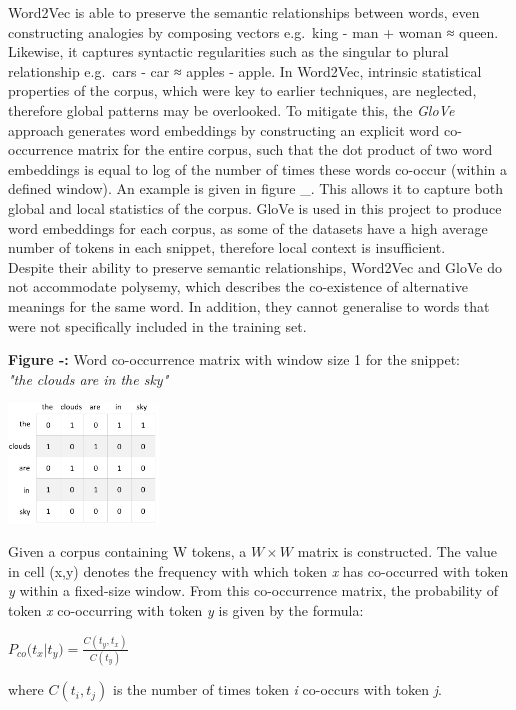 \documentclass[12pt,a4paper]{article}
\begin{document}
 Word2Vec is able to preserve the semantic relationships between words, even constructing analogies by composing vectors e.g.\ king - man + woman ≈ queen. Likewise, it captures syntactic regularities such as the singular to plural relationship e.g.\ cars - car ≈ apples - apple. In Word2Vec, intrinsic statistical properties of the corpus, which were key to earlier techniques, are neglected, therefore global patterns may be overlooked. To mitigate this, the \textit{GloVe} \cite{pennington2014glove} approach generates word embeddings by constructing an explicit word co-occurrence matrix for the entire corpus, such that the dot product of two word embeddings is equal to log of the number of times these words co-occur (within a defined window). An example is given in figure \_. This allows it to capture both global and local statistics of the corpus. GloVe is used in this project to produce word embeddings for each corpus, as some of the datasets have a high average number of tokens in each snippet, therefore local context is insufficient.\\
Despite their ability to preserve semantic relationships, Word2Vec and GloVe do not accommodate polysemy, which describes the co-existence of alternative meanings for the same word. In addition, they cannot generalise to words that were not specifically included in the training set.

\begin{center}
	\textbf{Figure -:} Word co-occurrence matrix with window size 1 for the snippet:\\ \textit{"the clouds are in the sky"}
\end{center}
\begin{center}
	\includegraphics[width=0.3\textwidth]{Images/glovediagram.png}
	\label{GloVe Pipeline}
\end{center}

Given a corpus containing W tokens, a $W \times W$ matrix is constructed. The value in cell (x,y) denotes the frequency with which token \textit{x} has co-occurred with token \textit{y} within a fixed-size window. From this co-occurrence matrix, the probability of token \textit{x} co-occurring with token \textit{y} is given by the formula: \begin{center}
	$P_{co}\bigl( t_x | t_y\bigr) = \frac{C(t_y, t_x)}{C(t_y)}$
\end{center}
where $C(t_i, t_j)$ is the number of times token \textit{i} co-occurs with token \textit{j}.
\end{document}
